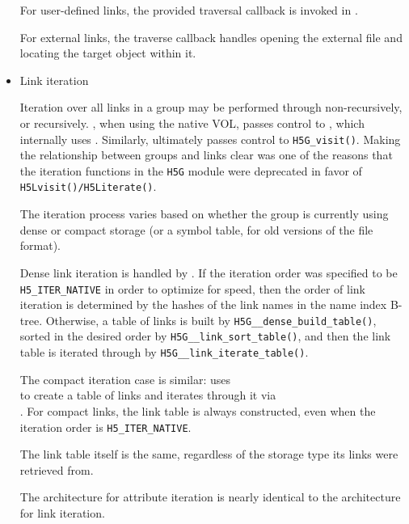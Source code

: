 \begin{itemize}
For user-defined links, the provided traversal callback is invoked in .

For external links, the traverse callback  handles opening the external file and locating the target object within it.

    \item Link iteration

Iteration over all links in a group may be performed through  non-recursively, or  recursively. , when using the native VOL, passes control to , which internally uses . Similarly,  ultimately passes control to \texttt{H5G\_visit()}. Making the relationship between groups and links clear was one of the reasons that the iteration functions in the \texttt{H5G} module were deprecated in favor of \texttt{H5Lvisit()/H5Literate()}.

The iteration process varies based on whether the group is currently using dense or compact storage (or a symbol table, for old versions of the file format).

Dense link iteration is handled by . If the iteration order was specified to be \texttt{H5\_ITER\_NATIVE} in order to optimize for speed, then the order of link iteration is determined by the hashes of the link names in the name index B-tree. Otherwise, a table of links is built by \texttt{H5G\_\_dense\_build\_table()}, sorted in the desired order by \texttt{H5G\_\_link\_sort\_table()}, and then the link table is iterated through by \texttt{H5G\_\_link\_iterate\_table()}. %

The compact iteration case is similar:  uses \\  to create a table of links and iterates through it via \\ . For compact links, the link table is always constructed, even when the iteration order is \texttt{H5\_ITER\_NATIVE}.

The link table itself is the same, regardless of the storage type its links were retrieved from.

The architecture for attribute iteration is nearly identical to the architecture for link iteration.

\end{itemize}

